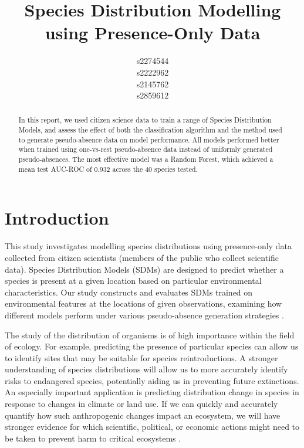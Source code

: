 \documentclass{article}
\title{Species Distribution Modelling using Presence-Only Data}
\author{
  s2274544\\
  \And
  s2222962\\
 \And
  s2145762\\
  \And
  s2859612 
}
\begin{document}
\maketitle

\begin{abstract}\vspace{-0.4em}
In this report, we used citizen science data to train a range of Species Distribution Models, and assess the effect of both the classification algorithm and the method used to generate pseudo-absence data on model
performance. %
All models performed better when trained using one-vs-rest pseudo-absence data instead of uniformly generated pseudo-absences. The most effective model was a Random Forest, which achieved a mean test AUC-ROC of 0.932 across the 40 species tested.
\end{abstract}

\section{Introduction}\vspace{-0.5em}
This study investigates modelling species distributions using presence-only data collected from citizen scientists (members of the public who collect scientific data). Species Distribution Models (SDMs) are designed to predict whether a species is present at a given location based on particular environmental characteristics. Our study constructs and evaluates SDMs trained on environmental features at the locations of given observations, examining how different models perform under various pseudo-absence generation strategies \cite{SDM_tutorial}.

The study of the distribution of organisms is of high importance within the field of ecology. For example, predicting the presence of particular species can allow us to identify sites that may be suitable for species reintroductions. A stronger understanding of species distributions will allow us to more accurately identify risks to endangered species, potentially aiding us in preventing future extinctions. An especially important application is predicting distribution change in species in response to changes in climate or land use. If we can quickly and accurately quantify how such anthropogenic changes impact an ecosystem, we will have stronger evidence for which scientific, political, or economic actions might need to be taken to prevent harm to critical ecosystems \cite{presence_absence_value}.
\end{document}
